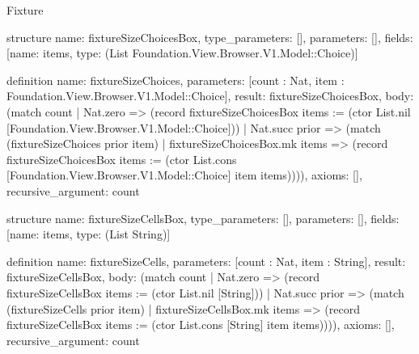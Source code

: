 \begin{lexlean}{Fixture}
\begin{semanticmodule}
structure{
  name: fixtureSizeChoicesBox,
  type_parameters: [],
  parameters: [],
  fields: [{name: items, type: (List Foundation.View.Browser.V1.Model::Choice)}]
}

definition{
  name: fixtureSizeChoices,
  parameters: [count : Nat, item : Foundation.View.Browser.V1.Model::Choice],
  result: fixtureSizeChoicesBox,
  body: (match count
    | Nat.zero => (record fixtureSizeChoicesBox {items := (ctor List.nil [Foundation.View.Browser.V1.Model::Choice])})
    | Nat.succ prior => (match (fixtureSizeChoices prior item)
      | fixtureSizeChoicesBox.mk items => (record fixtureSizeChoicesBox {items := (ctor List.cons [Foundation.View.Browser.V1.Model::Choice] item items)}))),
  axioms: [],
  recursive_argument: count
}

structure{
  name: fixtureSizeCellsBox,
  type_parameters: [],
  parameters: [],
  fields: [{name: items, type: (List String)}]
}

definition{
  name: fixtureSizeCells,
  parameters: [count : Nat, item : String],
  result: fixtureSizeCellsBox,
  body: (match count
    | Nat.zero => (record fixtureSizeCellsBox {items := (ctor List.nil [String])})
    | Nat.succ prior => (match (fixtureSizeCells prior item)
      | fixtureSizeCellsBox.mk items => (record fixtureSizeCellsBox {items := (ctor List.cons [String] item items)}))),
  axioms: [],
  recursive_argument: count
}


\end{semanticmodule}
\end{lexlean}
